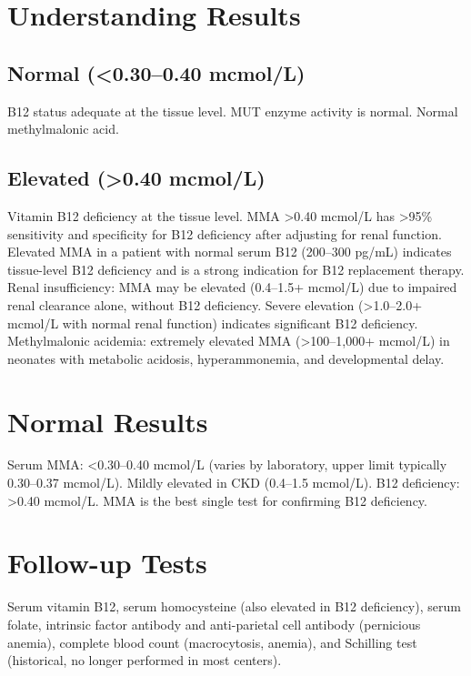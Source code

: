 \section*{Understanding Results}
\subsection*{Normal (<0.30--0.40 mcmol/L)}
B12 status adequate at the tissue level. MUT enzyme activity is normal. Normal methylmalonic acid.
\subsection*{Elevated (>0.40 mcmol/L)}
Vitamin B12 deficiency at the tissue level. MMA >0.40 mcmol/L has >95\% sensitivity and specificity for B12 deficiency after adjusting for renal function. Elevated MMA in a patient with normal serum B12 (200--300 pg/mL) indicates tissue-level B12 deficiency and is a strong indication for B12 replacement therapy. Renal insufficiency: MMA may be elevated (0.4--1.5+ mcmol/L) due to impaired renal clearance alone, without B12 deficiency. Severe elevation (>1.0--2.0+ mcmol/L with normal renal function) indicates significant B12 deficiency. Methylmalonic acidemia: extremely elevated MMA (>100--1,000+ mcmol/L) in neonates with metabolic acidosis, hyperammonemia, and developmental delay.
\section*{Normal Results}
Serum MMA: <0.30--0.40 mcmol/L (varies by laboratory, upper limit typically 0.30--0.37 mcmol/L). Mildly elevated in CKD (0.4--1.5 mcmol/L). B12 deficiency: >0.40 mcmol/L. MMA is the best single test for confirming B12 deficiency.
\section*{Follow-up Tests}
Serum vitamin B12, serum homocysteine (also elevated in B12 deficiency), serum folate, intrinsic factor antibody and anti-parietal cell antibody (pernicious anemia), complete blood count (macrocytosis, anemia), and Schilling test (historical, no longer performed in most centers).
